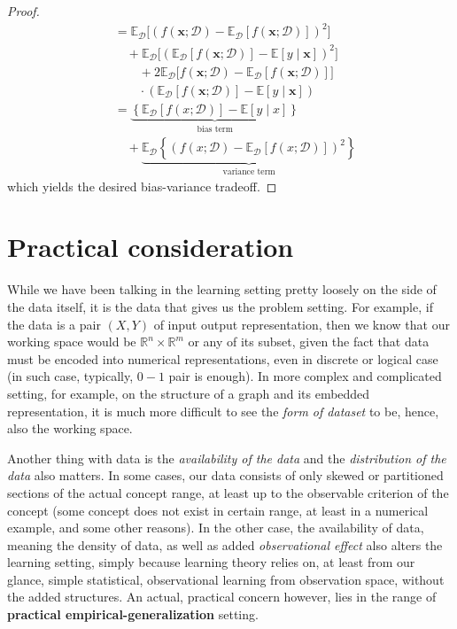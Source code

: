 \documentclass[
  journal=largetwo,
  year=2025,
  volume=37,
]{cup-journal}
\begin{document}
\begin{proof}
\begin{equation}
\begin{split}
            & = \mathbb{E}_{\mathcal{D}} \Big[(f(\mathbf{x};\mathcal{D})-\mathbb{E}_{\mathcal{D}}[f(\mathbf{x};\mathcal{D})])^{2}\Big] \\
            &\quad + \mathbb{E}_{\mathcal{D}} \Big[ (\mathbb{E}_{\mathcal{D}} [f(\mathbf{x};\mathcal{D})] - \mathbb{E}[y\mid \mathbf{x}])^{2} \Big] \\
            &\quad \quad +2\mathbb{E}_{\mathcal{D}}\Big[f(\mathbf{x};\mathcal{D})-\mathbb{E}_{\mathcal{D}}[f(\mathbf{x};\mathcal{D})]\Big]\\
            &\quad \quad \cdot (\mathbb{E}_{\mathcal{D}}[f(\mathbf{x};\mathcal{D})]-\mathbb{E}[y\mid \mathbf{x}]) \\
            & = \underbrace{\left\{ \mathbb{E}_{\mathcal{D}}[f(x;\mathcal{D})] - \mathbb{E}[y\mid x] \right\}}_{\text{bias term}} \\
            &\quad + \underbrace{\mathbb{E}_{\mathcal{D}} \left\{(f(x;\mathcal{D})- \mathbb{E}_{\mathcal{D}}[f(x;\mathcal{D})])^{2}\right\}}_{\text{variance term}}
        \end{split}
    \end{equation}
    which yields the desired bias-variance tradeoff. 
\end{proof}

\section{Practical consideration}

While we have been talking in the learning setting pretty loosely on the side of the data itself, it is the data that gives us the problem setting. For example, if the data is a pair $(X,Y)$ of input output representation, then we know that our working space would be $\mathbb{R}^n \times \mathbb{R}^m$ or any of its subset, given the fact that data must be encoded into numerical representations, even in discrete or logical case (in such case, typically, $0-1$ pair is enough). In more complex and complicated setting, for example, on the structure of a graph and its embedded representation, it is much more difficult to see the \textit{form of dataset} to be, hence, also the working space. 

Another thing with data is the \textit{availability of the data} and the \textit{distribution of the data} also matters. In some cases, our data consists of only skewed or partitioned sections of the actual concept range, at least up to the observable criterion of the concept (some concept does not exist in certain range, at least in a numerical example, and some other reasons). In the other case, the availability of data, meaning the density of data, as well as added \textit{observational effect} also alters the learning setting, simply because learning theory relies on, at least from our glance, simple statistical, observational learning from observation space, without the added structures. An actual, practical concern however, lies in the range of \textbf{practical empirical-generalization} setting. 
\end{document}

